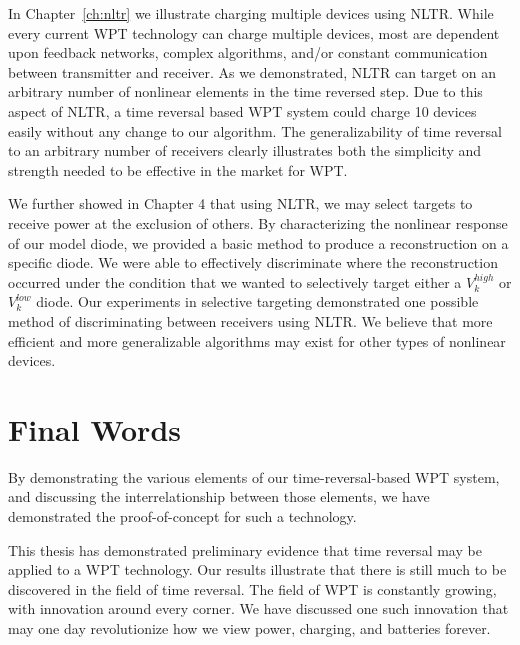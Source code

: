 In Chapter~\ref{ch:nltr} we illustrate charging multiple devices using NLTR. While every current WPT technology can charge multiple devices, most are dependent upon feedback networks, complex algorithms, and/or constant communication between transmitter and receiver. As we demonstrated, NLTR can target on an arbitrary number of nonlinear elements in the time reversed step. Due to this aspect of NLTR, a time reversal based WPT system could charge 10 devices easily without any change to our algorithm. The generalizability of time reversal to an arbitrary number of receivers clearly illustrates both the simplicity and strength needed to be effective in the market for WPT.

We further showed in Chapter 4 that using NLTR, we may select targets to receive power at the exclusion of others. By characterizing the nonlinear response of our model diode, we provided a basic method to produce a reconstruction on a specific diode. We were able to effectively discriminate where the reconstruction occurred under the condition that we wanted to selectively target either a $V_{k}^{high}$ or $V_{k}^{low}$ diode. Our experiments in selective targeting demonstrated one possible method of discriminating between receivers using NLTR. We believe that more efficient and more generalizable algorithms may exist for other types of nonlinear devices.

\section{Final Words}

By demonstrating the various elements of our time-reversal-based WPT system, and discussing the interrelationship between those elements, we have demonstrated the proof-of-concept for such a technology.

This thesis has demonstrated preliminary evidence that time reversal may be applied to a WPT technology. Our results illustrate that there is still much to be discovered in the field of time reversal. The field of WPT is constantly growing, with innovation around every corner. We have discussed one such innovation that may one day revolutionize how we view power, charging, and batteries forever.

